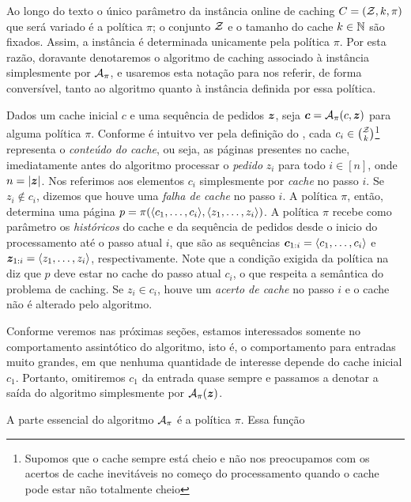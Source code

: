 \newpage

Ao longo do texto o único parâmetro da instância online de caching \(C = (\mathcal{Z}, k, \pi)\) que será variado é a política \(\pi\); o conjunto \(\mathcal{Z}\) e o tamanho do cache \(k \in \mathbb{N}\) são fixados. Assim, a instância é determinada unicamente pela política \(\pi\). Por esta razão, doravante denotaremos o algoritmo de caching associado à instância simplesmente por \(\mathcal{A}_{\pi}\), e usaremos esta notação para nos referir, de forma conversível, tanto ao algoritmo quanto à instância definida por essa política.

Dados um cache inicial \(c\) e uma sequência de pedidos \(\bm{z}\), seja \(\bm{c} = \mathcal{A}_\pi(c, \bm{z})\) para alguma política \(\pi\). Conforme é intuitvo ver pela definição do , cada \(c_i \in \binom{\mathcal{Z}}{k}\)\footnote{Supomos que o cache sempre está cheio e não nos preocupamos com os acertos de cache inevitáveis no começo do processamento quando o cache pode estar não totalmente cheio} representa o \emph{conteúdo do cache}, ou seja, as páginas presentes no cache, imediatamente antes do algoritmo processar o \emph{pedido} \(z_i\) para todo \(i \in [n]\), onde \(n = |\bm{z}|\). Nos referimos aos elementos \(c_i\) simplesmente por \emph{cache} no passo \(i\). Se \(z_i \notin c_i\), dizemos que houve uma \emph{falha de cache} no passo \(i\). A política \(\pi\), então, determina uma página \(p = \pi(\langle c_1, \dotsc, c_{i}\rangle, \langle z_1, \dotsc, z_{i}\rangle) \).  A política \(\pi\) recebe como parâmetro os \emph{históricos} do cache e da sequência de pedidos desde o inicio do processamento até o passo atual \(i\), que são as sequências \(\bm{c}_{1:i} = \langle c_1, \dotsc, c_i\rangle\) e \(\bm{z}_{1:i} = \langle z_1, \dotsc, z_i\rangle\), respectivamente. Note que a condição exigida da política na  diz que \(p\) deve estar no cache do passo atual \(c_i\), o que respeita a semântica do problema de caching. Se \(z_i \in c_i\), houve um \emph{acerto de cache} no passo \(i\) e o cache não é alterado pelo algoritmo.

Conforme veremos nas próximas seções, estamos interessados somente no comportamento assintótico do algoritmo, isto é, o comportamento para entradas muito grandes, em que nenhuma quantidade de interesse depende do cache inicial \(c_1\). Portanto, omitiremos \(c_1\) da entrada quase sempre e passamos a denotar a saída do algoritmo simplesmente por \(\mathcal{A}_\pi(\bm{z})\).

A parte essencial do algoritmo \(\mathcal{A}_\pi\) é a política \(\pi\). Essa função


